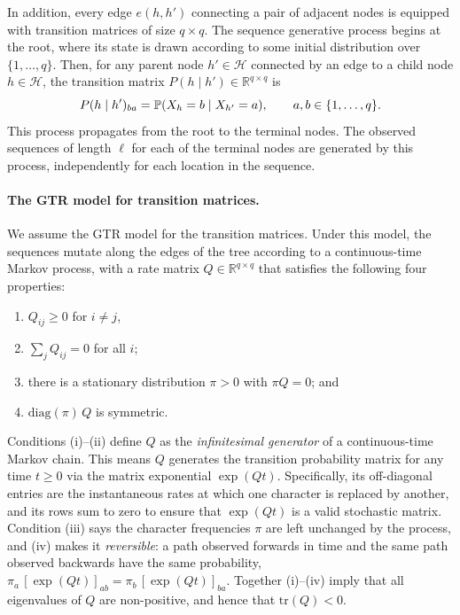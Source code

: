 In addition, every edge $e(h, h')$ connecting a pair of adjacent nodes is equipped with transition matrices of size $q \times q$. The sequence generative process begins at the root, where its state is drawn according to some initial distribution over $\{1, \ldots, q\}$. Then, for any parent node $h' \in \mathcal{H}$ connected by an edge to a child node $h \in \mathcal{H}$, the transition matrix $P(h \mid h') \in \mathbb{R}^{q \times q}$ is 
\begin{equation}
    P(h \mid h')_{ba} = \mathbb{P}(X_{h} = b \mid X_{h'} = a), \qquad a, b \in \{1, \ldots, q\}.
    \label{eq:P_h_htag}
\end{equation}
This process propagates from the root to the terminal nodes. The observed sequences of length $\ell$ for each of the terminal nodes are generated by this process, independently for each location in the sequence.


\paragraph{The GTR model for transition matrices.}
We assume the GTR model for the transition matrices. 
Under this model, the sequences mutate along the edges of the tree according to a continuous-time Markov process, with a rate matrix $Q\in \mathbb{R}^{q\times q}$ that satisfies the following four properties:


\begin{enumerate}[label=(\roman*), leftmargin=2.2em, itemsep=1pt, topsep=3pt]
\item $Q_{ij}\ge0$ for $i\ne j$,
\item $\sum_j Q_{ij}=0$ for all $i$;
\item there is a stationary distribution $\pi>0$ with $\pi Q=0$; and
\item $\mathrm{diag}(\pi)\,Q$ is symmetric.
\end{enumerate}
Conditions (i)--(ii) define $Q$ as the \emph{infinitesimal generator} of a continuous-time Markov chain. This means $Q$ generates the transition probability matrix for any time $t\ge0$ via the matrix exponential $\exp(Qt)$. Specifically, its off-diagonal entries are the instantaneous rates at which one character is replaced by another, and its rows sum to zero to ensure that $\exp(Qt)$ is a valid stochastic matrix. Condition (iii) says the character frequencies $\pi$ are left unchanged by the process, and (iv) makes it \emph{reversible}: a path observed forwards in time and the same path observed backwards have the same probability, $\pi_a\,[\exp(Qt)]_{ab}=\pi_b\,[\exp(Qt)]_{ba}$. Together (i)--(iv) imply that all eigenvalues of $Q$ are non-positive, and hence that $\mathrm{tr}(Q)<0$.

